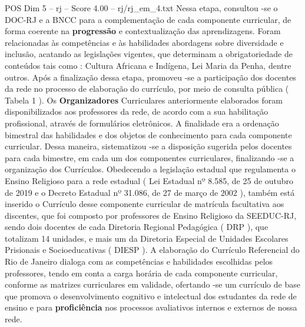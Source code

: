 \begin{textsample}{POS Dim 5 – rj – Score 4.00 – rj/rj\_em\_4.txt}
Nessa etapa, consultou -se o DOC-RJ e a BNCC para a complementação de cada componente curricular, de forma coerente na \textbf{progressão} e contextualização das aprendizagens.
Foram relacionadas às competências e às habilidades abordagens sobre diversidade e inclusão, acatando as legislações vigentes, que determinam a obrigatoriedade de conteúdos tais como : Cultura Africana e Indígena, Lei Maria da Penha, dentre outros.
Após a finalização dessa etapa, promoveu -se a participação dos docentes da rede no processo de elaboração do currículo, por meio de consulta pública ( Tabela 1 ).
Os \textbf{Organizadores} Curriculares anteriormente elaborados foram disponibilizados aos professores da rede, de acordo com a sua habilitação profissional, através de formulários eletrônicos.
A finalidade era a ordenação bimestral das habilidades e dos objetos de conhecimento para cada componente curricular.
Dessa maneira, sistematizou -se a disposição sugerida pelos docentes para cada bimestre, em cada um dos componentes curriculares, finalizando -se a organização dos Currículos.
Obedecendo a legislação estadual que regulamenta o Ensino Religioso para a rede estadual ( Lei Estadual nº 8.585, de 25 de outubro de 2019 e o Decreto Estadual nº 31.086, de 27 de março de 2002 ), também está inserido o Currículo desse componente curricular de matrícula facultativa aos discentes, que foi composto por professores de Ensino Religioso da SEEDUC-RJ, sendo dois docentes de cada Diretoria Regional Pedagógica ( DRP ), que totalizam 14 unidades, e mais um da Diretoria Especial de Unidades Escolares Prisionais e Socioeducativas ( DIESP ).
A elaboração do Currículo Referencial do Rio de Janeiro dialoga com as competências e habilidades escolhidas pelos professores, tendo em conta a carga horária de cada componente curricular, conforme as matrizes curriculares em validade, ofertando -se um currículo de base que promova o desenvolvimento cognitivo e intelectual dos estudantes da rede de ensino e para \textbf{proficiência} nos processos avaliativos internos e externos de nossa rede.

\end{textsample}
